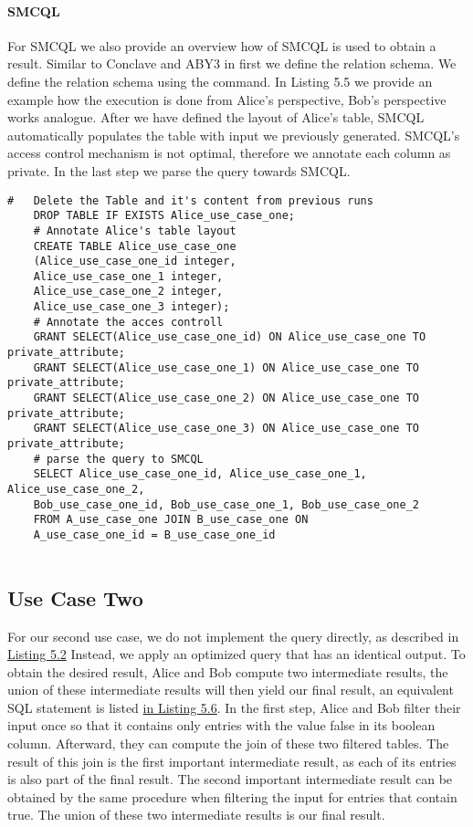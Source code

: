 \paragraph{SMCQL}
For SMCQL we also provide an overview how of SMCQL is used to obtain a result. Similar to Conclave and ABY3 in first we define the relation schema. We define the relation schema using the  command. In Listing 5.5 we provide an example how the execution is done from Alice's perspective, Bob's perspective works analogue. After we have defined the layout of Alice's table, SMCQL automatically populates the table with input we previously generated. SMCQL's access control mechanism is not optimal, therefore we annotate each column as private. In the last step we parse the query towards SMCQL.

\label{use_case1_sql}
\begin{lstlisting}[caption={Simplified Setup of SMCQL for our first use case }]
	#	Delete the Table and it's content from previous runs
	DROP TABLE IF EXISTS Alice_use_case_one;
	# Annotate Alice's table layout
	CREATE TABLE Alice_use_case_one
	(Alice_use_case_one_id integer, 
	Alice_use_case_one_1 integer, 
	Alice_use_case_one_2 integer, 
	Alice_use_case_one_3 integer);
	# Annotate the acces controll 
	GRANT SELECT(Alice_use_case_one_id) ON Alice_use_case_one TO private_attribute;
	GRANT SELECT(Alice_use_case_one_1) ON Alice_use_case_one TO private_attribute;
	GRANT SELECT(Alice_use_case_one_2) ON Alice_use_case_one TO private_attribute;
	GRANT SELECT(Alice_use_case_one_3) ON Alice_use_case_one TO private_attribute;
	# parse the query to SMCQL
	SELECT Alice_use_case_one_id, Alice_use_case_one_1, Alice_use_case_one_2, 
	Bob_use_case_one_id, Bob_use_case_one_1, Bob_use_case_one_2  
	FROM A_use_case_one JOIN B_use_case_one ON
	A_use_case_one_id = B_use_case_one_id 
	
\end{lstlisting}

\subsection{Use Case Two}
\label{use_case2}
For our second use case, we do not implement the query directly, as described in \hyperref[SQL2_label]{Listing 5.2}  Instead, we apply an optimized query that has an identical output. To obtain the desired result, Alice and Bob compute two intermediate results, the union of these intermediate results will then yield our final result, an equivalent SQL statement is listed \hyperref[use_case2_alternative_sql]{ in Listing 5.6}.
In the first step, Alice and Bob filter their input once so that it contains only entries with the value false in its boolean column. Afterward, they can compute the join of these two filtered tables. The result of this join is the first important intermediate result, as each of its entries is also part of the final result. The second important intermediate result can be obtained by the same procedure when filtering the input for entries that contain true.
The union of these two intermediate results is our final result. 

